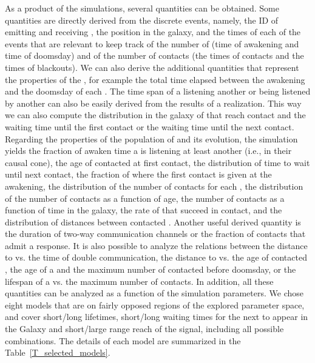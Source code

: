 As a product of the simulations, several quantities can be obtained.
%
Some quantities are directly derived from the discrete events, namely,
the ID of emitting and receiving \cetis, the position in the galaxy, and
the times of each of the events that are relevant to keep track of the
number of \cetis (time of awakening and time of doomsday) and of the
number of contacts (the times of contacts and the times of blackouts).
%
We can also derive the additional quantities that represent the
properties of the \cetis, for example the total time elapsed between the
awakening and the doomsday of each \ceti.
%
The time span of a \ceti listening another or being listened by another
can also be easily derived from the results of a realization.
%
This way we can also compute the distribution in the galaxy of \cetis
that reach contact and the waiting time until the first contact or the
waiting time until the next contact.
%
Regarding the properties of the population of \cetis and its evolution,
the simulation yields the fraction of awaken time a \ceti is listening
at least another \ceti (i.e., in their causal cone), the age of
contacted \cetis at first contact, the distribution of time to wait
until next contact, the fraction of \cetis where the first contact is
given at the awakening, the distribution of the number of contacts for
each \ceti, the distribution of the number of contacts as a function of
\ceti age, the number of contacts as a function of time in the galaxy,
the rate of \cetis that succeed in contact, and the distribution of
distances between contacted \cetis.
%
Another useful derived quantity is the duration of two-way
communication channels or the fraction of contacts that admit a
response.
% 
It is also possible to analyze the relations between the distance to
\ceti vs. the time of double communication, the distance to \ceti vs. the
age of contacted \ceti, the age of a \ceti and the maximum number of
contacted \cetis before doomsday, or the lifespan of a \ceti vs. the
maximum number of contacts.
%
In addition, all these quantities can be analyzed as a function of the
simulation parameters.
%
We chose eight models that are on fairly opposed regions of the
explored parameter space, and cover short/long lifetimes, short/long
waiting times for the next \ceti to appear in the Galaxy and short/large
range reach of the signal, including all possible combinations.
%
The details of each model are summarized in the
Table~\ref{T_selected_models}.



